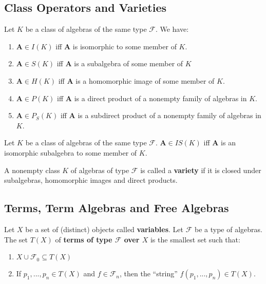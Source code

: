 \subsection{Class Operators and Varieties}

\begin{definition}
  Let $K$ be a class of algebras of the same type $\mathcal{F}$. We have:

  \begin{enumerate}
  \item $\boldsymbol{A} \in I(K)$ iff $\boldsymbol{A}$ is isomorphic to some member of $K$.
  \item $\boldsymbol{A} \in S(K)$ iff $\boldsymbol{A}$ is a subalgebra of some member of $K$
  \item $\boldsymbol{A} \in H(K)$ iff $\boldsymbol{A}$ is a homomorphic image of some member of $K$.
  \item $\boldsymbol{A} \in P(K)$ iff $\boldsymbol{A}$ is a direct product of a nonempty family of algebras in $K$.
  \item $\boldsymbol{A} \in P_S(K)$ iff $\boldsymbol{A}$ is a subdirect product of a nonempty family of algebras in $K$.
  \end{enumerate}


  \begin{definition}[IS(K)]
	Let $K$ be a class of algebras of the same type $\mathcal{F}$. $\boldsymbol{A} \in IS(K)$ iff $\boldsymbol{A}$ is an isomorphic subalgebra to some member of $K$.
  \end{definition}
\end{definition}

\begin{definition}[Variety]
	A nonempty class $K$ of algebras of type $\mathcal{F}$ is called a \textbf{variety} if it is closed under subalgebras, homomorphic images and direct products.
\end{definition}

\subsection{Terms, Term Algebras and Free Algebras}

\begin{definition}[$T(X)$]
  Let $X$ be a set of (distinct) objects called \textbf{variables}. Let
  $\mathcal{F}$ be a type of algebras. The set $T(X)$ of \textbf{terms of type
    $\mathcal{F}$ over $X$} is the smallest set such that:
  \begin{enumerate}
  \item $X \cup \mathcal{F}_0 \subseteq T(X)$
  \item If $p_1,...,p_n \in T(X)$ and $f \in \mathcal{F}_n$, then the ``string''
    $f(p_1,...,p_n) \in T(X)$.
  \end{enumerate}
\end{definition}

